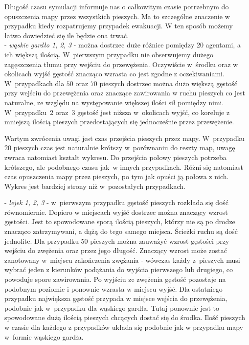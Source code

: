 Długość czasu symulacji informuje nas o całkowitym czasie potrzebnym do opuszczenia mapy przez wszystkich pieszych. Ma to szczególne znaczenie w przypadku kiedy rozpatrujemy przypadek ewakuacji. W ten sposób możemy łatwo dowiedzieć się ile będzie ona trwać. \\

- \textit{wąskie gardło 1, 2, 3} - można dostrzec duże różnice pomiędzy $20$ agentami, a ich większą ilością. W~pierwszym przypadku nie obserwujemy dużego zagęszczenia tłumu przy wejściu do przewężenia. Oczywiście w~środku oraz w okolicach wyjść gęstość znacząco wzrasta co jest zgodne z oczekiwaniami. W~przypadkach dla $50$ oraz $70$ pieszych dostrzec można dużo większą gęstość przy wejściu do przewężenia oraz znaczące zawirowania w ruchu pieszych co jest naturalne, ze względu na występowanie większej ilości sił pomiędzy nimi. W~przypadku~2 oraz~3 gęstość jest niższa w~okolicach wyjść, co koreluje z mniejszą ilością pieszych przedostających się jednocześnie przez przewężenie.

Wartym zwrócenia uwagi jest czas przejścia pieszych przez mapy. W~przypadku $20$ pieszych czas jest naturalnie krótszy w~porównaniu do reszty map, uwagę zwraca natomiast kształt wykresu. Do przejścia połowy pieszych potrzeba krótszego, ale podobnego czasu jak~w innych przypadkach. Różni się natomiast czas opuszczenia mapy przez pieszych, po tym jak opuści ją połowa z nich. Wykres jest bardziej strony niż w~pozostałych przypadkach.

- \textit{lejek 1, 2, 3} - w~pierwszym przypadku gęstość pieszych rozkłada się dość równomiernie. Dopiero w miejscach wyjść dostrzec można znaczący wzrost gęstości. Jest to spowodowane sporą ilością pieszych, którzy nie są po drodze znacząco zatrzymywani, a dążą do tego samego miejsca. Ścieżki ruchu są dość jednolite. Dla przypadku $50$ pieszych można zauważyć wzrost gęstości przy wejściu do zwężenia oraz przez jego długość. Znaczący wzrost może zostać zanotowany w~miejscu zakończenia zwężania - wówczas każdy z~pieszych musi wybrać jeden z kierunków podążania do wyjścia pierwszego lub drugiego, co powoduje spore zawirowania. Po wyjściu ze zwężenia gęstość pozostaje na podobnym poziomie i ponownie wzrasta w miejscu wyjść. Dla ostatniego przypadku największa gęstość przypada w miejsce wejścia do przewężenia, podobnie jak w~przypadku dla wąskiego gardła. Tutaj ponownie jest to spowodowane dużą ilością pieszych chcących dostać się do środka. 
Ilość pieszych w czasie dla każdego z przypadków układa się podobnie jak w przypadku mapy w~formie wąskiego gardła.

